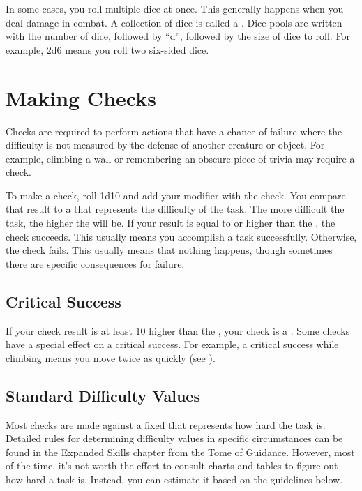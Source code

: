   In some cases, you roll multiple dice at once.
  This generally happens when you deal damage in combat.
  A collection of dice is called a .
  Dice pools are written with the number of dice, followed by ``d'', followed by the size of dice to roll.
  For example, 2d6 means you roll two six-sided dice.

\section{Making Checks}\label{Checks}\label{Making Checks}
  Checks are required to perform actions that have a chance of failure where the difficulty is not measured by the defense of another creature or object.
  For example, climbing a wall or remembering an obscure piece of trivia may require a check.

  To make a check, roll 1d10 and add your modifier with the check.
  You compare that result to a  that represents the difficulty of the task.
  The more difficult the task, the higher the  will be.
  If your result is equal to or higher than the , the check succeeds.
  This usually means you accomplish a task successfully.
  Otherwise, the check fails.
  This usually means that nothing happens, though sometimes there are specific consequences for failure.

  \subsection{Critical Success}
    If your check result is at least 10 higher than the , your check is a .
    Some checks have a special effect on a critical success.
    For example, a critical success while climbing means you move twice as quickly (see ).

  \subsection{Standard Difficulty Values}\label{Standard Difficulty Values}
    Most checks are made against a fixed  that represents how hard the task is.
    Detailed rules for determining difficulty values in specific circumstances can be found in the Expanded Skills chapter from the Tome of Guidance.
    However, most of the time, it's not worth the effort to consult charts and tables to figure out how hard a task is.
    Instead, you can estimate it based on the guidelines below.

